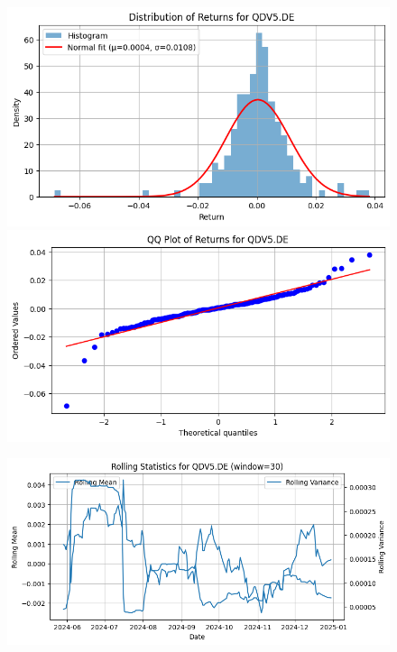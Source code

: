\documentclass{article}%
\begin{document}
\begin{figure}[htbp]%
\begin{minipage}{0.49\textwidth}%
\includegraphics[width=\linewidth]{ticker_images/QDV5.DE_return_distribution.png}%
\end{minipage}%
\begin{minipage}{0.49\textwidth}%
\includegraphics[width=\linewidth]{ticker_images/QDV5.DE_qq_plot.png}%
\end{minipage}%
\end{figure}

%


\begin{figure}[htbp]%
\begin{minipage}{0.49\textwidth}%
\includegraphics[width=\linewidth]{ticker_images/QDV5.DE_rolling_stats.png}%
\end{minipage}%
\end{figure}
\end{document}
